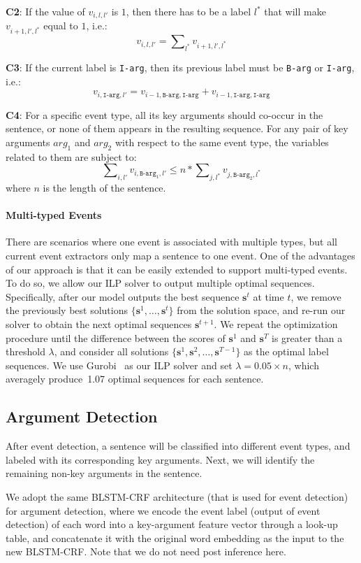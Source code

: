 \textbf{C2}: If the value of $v_{i,l,l'}$ is $1$, then there has to be a label $l^*$ that will make $v_{i+1,l',l^*}$ equal to $1$, i.e.:
\begin{equation}
	v_{i,l,l'} = \sum\nolimits_{l^*}v_{i+1,l',l^*}
\end{equation}

\textbf{C3}: If the current label is \texttt{I-arg}, then its previous label must be \texttt{B-arg} or \texttt{I-arg}, i.e.:
\begin{equation}
	v_{i,\texttt{I-arg},l'} = v_{i-1,\texttt{B-arg},\texttt{I-arg}} + v_{i-1, \texttt{I-arg}, \texttt{I-arg}}
\end{equation}

\textbf{C4}: For a specific event type, all its key arguments should co-occur in the sentence, or none of them appears in the resulting sequence. For any pair of key arguments $arg_1$ and $arg_2$ with respect to the same event type, the variables related to them are subject to:
\begin{equation}
	\sum\nolimits_{i,l'}{v_{i,\texttt{B-arg}_1,l'}} \leq n * \sum\nolimits_{j,l^*}{v_{j,\texttt{B-arg}_2,l^*}}
\end{equation}
where $n$ is the length of the sentence.

\paragraph{Multi-typed Events}
There are scenarios where one event is associated with multiple types, but all current event extractors only map a sentence to one event.
 One of the advantages of our approach is that it can be easily extended to support multi-typed events.
To do so, we allow our ILP solver to output multiple optimal sequences. Specifically, after our model outputs the best sequence $\bm{s}^t$
at time $t$, we remove the previously best solutions
 $\{\bm{s}^1, \ldots, \bm{s}^{t}\}$ from the solution space, and re-run our solver to obtain the next optimal sequences $\bm{s}^{t+1}$.
We repeat the optimization procedure until the difference between the scores of $\bm{s}^1$ and $\bm{s}^T$ is greater
than a threshold $\lambda$, and consider all solutions $\{\bm{s}^1, \bm{s}^2, \ldots, \bm{s}^{T-1}\}$ as the optimal label sequences.
We use Gurobi~\cite{gurobi} as our ILP solver and set $\lambda=0.05 \times n$, which averagely produce~1.07 optimal sequences for each sentence.

\subsection{Argument Detection}
After event detection, a sentence will be classified into different event types, and labeled with its corresponding key arguments.
Next, we will identify the remaining non-key arguments in the sentence.

We adopt the same BLSTM-CRF architecture (that is used for event detection) for argument detection, where we encode the event label (output
of event detection) of each word into a key-argument feature vector through a look-up table, and concatenate it with the original word
embedding as the input to the new BLSTM-CRF. Note that we do not need post inference here.
